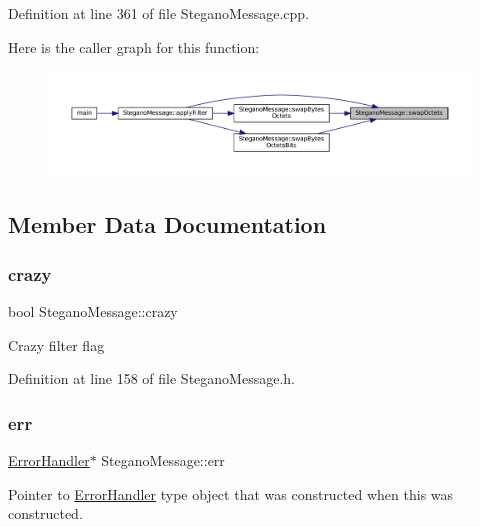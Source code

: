 Definition at line 361 of file Stegano\+Message.\+cpp.

Here is the caller graph for this function\+:
\nopagebreak
\begin{figure}[H]
\begin{center}
\leavevmode
\includegraphics[width=350pt]{classSteganoMessage_a4751ad396485b5859b84970ddd20290d_icgraph}
\end{center}
\end{figure}


\subsection{Member Data Documentation}
\mbox{\label{classSteganoMessage_aa66c9e1d0367981d42ede819e1a51131}} 
\subsubsection{\texorpdfstring{crazy}{crazy}}
{\footnotesize\ttfamily bool Stegano\+Message\+::crazy\hspace{0.3cm}{\ttfamily [private]}}

Crazy filter flag 

Definition at line 158 of file Stegano\+Message.\+h.

\mbox{\label{classSteganoMessage_a26b631e00716be7a89cbcf22cf0b7291}} 
\subsubsection{\texorpdfstring{err}{err}}
{\footnotesize\ttfamily \mbox{\hyperlink{classErrorHandler}{Error\+Handler}}$\ast$ Stegano\+Message\+::err\hspace{0.3cm}{\ttfamily [private]}}

Pointer to \mbox{\hyperlink{classErrorHandler}{Error\+Handler}} type object that was constructed when this was constructed. 

